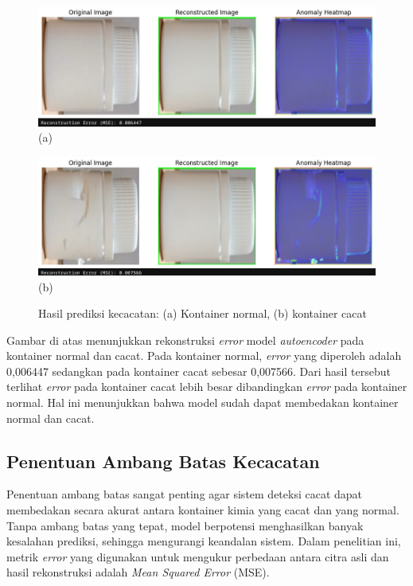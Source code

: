 \begin{figure}[H]
  \centering
  \begin{minipage}{\textwidth}
    \centering
    \includegraphics[width=\textwidth]{gambar/kontainer_bagus.jpeg}
    (a)
  \end{minipage}
  \vspace{1em}

  \begin{minipage}{\textwidth}
    \centering
    \includegraphics[width=\textwidth]{gambar/kontainer_cacat.jpeg}
    (b)
  \end{minipage}
  \caption{Hasil prediksi kecacatan: (a) Kontainer normal, (b)
  kontainer cacat}
  \label{fig:autoencoder-test}
  \vspace{-1em}
\end{figure}

Gambar di atas menunjukkan rekonstruksi \textit{error} model
\textit{autoencoder} pada kontainer normal dan cacat. Pada kontainer
normal, \textit{error} yang diperoleh adalah 0,006447 sedangkan pada
kontainer cacat sebesar 0,007566. Dari hasil tersebut terlihat
\textit{error} pada kontainer cacat lebih besar dibandingkan
\textit{error} pada kontainer normal. Hal ini menunjukkan bahwa model
sudah dapat membedakan kontainer normal dan cacat.

\vspace{1em}

\subsection{Penentuan Ambang Batas Kecacatan}
Penentuan ambang batas sangat penting agar sistem deteksi cacat dapat
membedakan secara akurat antara kontainer kimia yang cacat dan yang
normal. Tanpa ambang batas yang tepat, model berpotensi menghasilkan
banyak kesalahan prediksi, sehingga mengurangi keandalan sistem.
Dalam penelitian ini, metrik \textit{error} yang digunakan untuk
mengukur perbedaan antara citra asli dan hasil rekonstruksi adalah
\textit{Mean Squared Error} (MSE).

